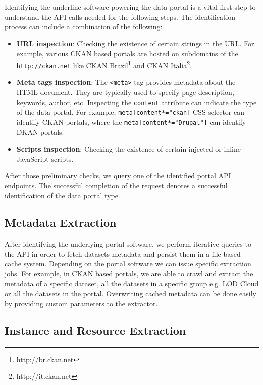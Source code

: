 \documentclass[runningheads,a4paper]{llncs}
\begin{document}
Identifying the underline software powering the data portal is a vital first step to understand the API calls needed for the following steps. The identification process can include a combination of the following:

\begin{itemize}
  \item \textbf{URL inspection}: Checking the existence of certain strings in the URL. For example, various CKAN based portals are hosted on subdomains of the \texttt{http://ckan.net} like CKAN Brazil\footnote{http://br.ckan.net} and CKAN Italia\footnote{http://it.ckan.net}.
  \item \textbf{Meta tags inspection}: The \texttt{<meta>} tag provides metadata about the HTML document. They are typically used to specify page description, keywords, author, etc. Inspecting the \texttt{content} attribute can indicate the type of the data portal. For example, \texttt{meta[content*="ckan]} CSS selector can identify CKAN portals, where the \texttt{meta[content*="Drupal"]} can identify DKAN portals.
  \item \textbf{Scripts inspection}: Checking the existence of certain injected or inline JavaScript scripts.
\end{itemize}

After those preliminary checks, we query one of the identified portal API endpoints. The successful completion of the request denotes a successful identification of the data portal type.

\subsection{Metadata Extraction}

After identifying the underlying portal software, we perform iterative queries to the API in order to fetch datasets metadata and persist them in a file-based cache system. Depending on the portal software we can issue specific extraction jobs. For example, in CKAN based portals, we are able to crawl and extract the metadata of a specific dataset, all the datasets in a specific group e.g. LOD Cloud or all the datasets in the portal. Overwriting cached metadata can be done easily by providing custom parameters to the extractor.

\subsection{Instance and Resource Extraction}
\end{document}
